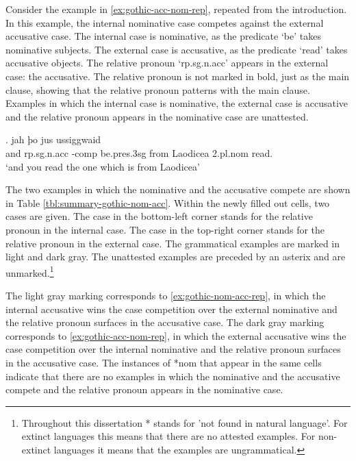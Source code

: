 Consider the example in \ref{ex:gothic-acc-nom-rep}, repeated from the introduction. In this example, the internal nominative case competes against the external accusative case.
The internal case is nominative, as the predicate  `be' takes nominative subjects.
The external case is accusative, as the predicate  `read' takes accusative objects.
The relative pronoun  `\ac{rp}.\ac{sg}.\ac{n}.\ac{acc}' appears in the external case: the accusative. The relative pronoun is not marked in bold, just as the main clause, showing that the relative pronoun patterns with the main clause.
Examples in which the internal case is nominative, the external case is accusative and the relative pronoun appears in the nominative case are unattested.

\exg. jah þo     jus ussiggwaid\\
 and \ac{rp}.\ac{sg}.\ac{n}.\ac{acc} -\ac{comp} be.\ac{pres}.3\ac{sg}\scsub{[nom]} from Laodicea 2.\ac{pl}.\ac{nom} read.\scsub{[acc]}\\
 `and you read the one which is from Laodicea' \label{ex:gothic-acc-nom-rep}

The two examples in which the nominative and the accusative compete are shown in Table \ref{tbl:summary-gothic-nom-acc}. Within the newly filled out cells, two cases are given. The case in the bottom-left corner stands for the relative pronoun in the internal case. The case in the top-right corner stands for the relative pronoun in the external case. The grammatical examples are marked in light and dark gray. The unattested examples are preceded by an asterix and are unmarked.\footnote{
Throughout this dissertation * stands for 'not found in natural language'. For extinct languages this means that there are no attested examples. For non-extinct languages it means that the examples are ungrammatical.
}

The light gray marking corresponds to \ref{ex:gothic-nom-acc-rep}, in which the internal accusative wins the case competition over the external nominative and the relative pronoun surfaces in the accusative case. The dark gray marking corresponds to \ref{ex:gothic-acc-nom-rep}, in which the external accusative wins the case competition over the internal nominative and the relative pronoun surfaces in the accusative case. The instances of *\ac{nom} that appear in the same cells indicate that there are no examples in which the nominative and the accusative compete and the relative pronoun appears in the nominative case.

